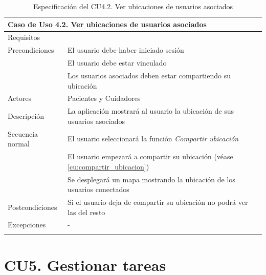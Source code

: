 \begin{longtable}{|p{} p{}|}
    \hline
    \multicolumn{2}{|l|}{\textbf{Caso de Uso 4.2. Ver ubicaciones de usuarios asociados}} \\ \hline \hline
    Requisitos          & {req:ver_ubicaciones} \\ \hline
    Precondiciones      & El usuario debe haber iniciado sesión \\
                        & El usuario debe estar vinculado \\
                        & Los usuarios asociados deben estar compartiendo su ubicación  \\ \hline
    Actores             & Pacientes y Cuidadores \\ \hline
    Descripción         & La aplicación mostrará al usuario la ubicación de sus usuarios asociados \\ \hline
    Secuencia normal    & El usuario seleccionará la función \emph{Compartir ubicación} \\
                        & El usuario empezará a compartir su ubicación (véase \ref{cu:compartir_ubicacion}) \\
                        & Se desplegará un mapa mostrando la ubicación de los usuarios conectados \\ \hline
    Postcondiciones     & Si el usuario deja de compartir su ubicación no podrá ver las del resto \\ \hline
    Excepciones         & - \\ \hline
    \caption{Especificación del CU4.2. Ver ubicaciones de usuarios asociados}
    \label{cu:ver_ubicaciones}
\end{longtable}

\section{CU5. Gestionar tareas}
\label{sec:cu:tareas}

